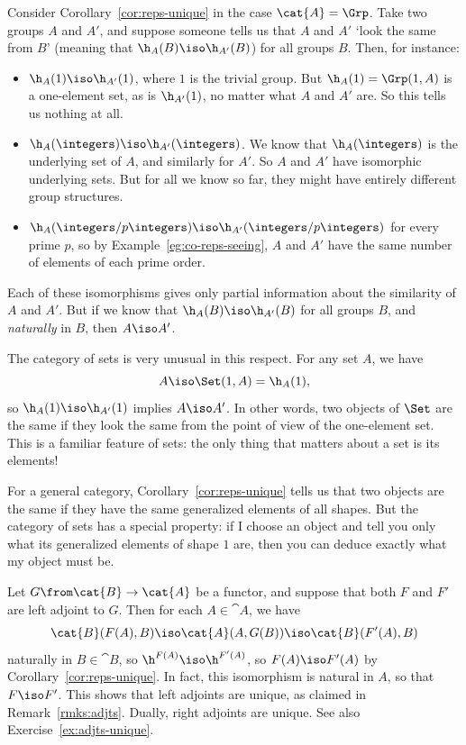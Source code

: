 \begin{example} 
Consider Corollary~\ref{cor:reps-unique} in the case $\cat{A} = \Grp$.
Take two groups $A$ and $A'$, and suppose someone tells us that $A$ and
$A'$ `look the same from $B$' (meaning that $\h_A(B) \iso \h_{A'}(B)$) for
all groups $B$.  Then, for instance:
% 
\begin{itemize}
\item 
$\h_A(1) \iso \h_{A'}(1)$, where $1$ is the trivial group.  But $\h_A(1) =
\Grp(1, A)$ is a one-element set, as is $\h_{A'}(1)$, no matter what $A$
and $A'$ are.  So this tells us nothing at all.

\item 
$\h_A(\integers) \iso \h_{A'}(\integers)$.  We know that $\h_A(\integers)$
is the underlying set of $A$, and similarly for $A'$.  So $A$ and $A'$
have isomorphic underlying sets.  But for all we know so far, they might
have entirely different group structures.

\item 
$\h_A(\integers/p\integers) \iso \h_{A'}(\integers/p\integers)$ for every
prime $p$, so by Example~\ref{eg:co-reps-seeing}, $A$ and $A'$ have the
same number of elements of each prime order.%
%
%
\end{itemize}
% 
Each of these isomorphisms gives only partial information about the
similarity of $A$ and $A'$.  But if we know that $\h_A(B) \iso \h_{A'}(B)$
for all groups $B$, and \emph{naturally} in $B$, then $A \iso A'$.
\end{example}

\begin{example}
The category of sets is very unusual in this respect.  For any set $A$, we have
\[
A \iso \Set(1, A) = \h_A(1),
\]
so $\h_A(1) \iso \h_{A'}(1)$ implies $A \iso A'$.  In other words, two
objects of $\Set$ are the same if they look the same from the point of view
of the one-element set.  This is a familiar feature of sets: the only thing
that matters about a set is its elements!

For a general category, Corollary~\ref{cor:reps-unique} tells us that two
objects are the same if they have the same generalized%
%
%
elements of all shapes.  But the category of sets has a special property:
if I choose an object and tell you only what its generalized elements of
shape $1$ are, then you can deduce exactly what my object must be.
\end{example}

\begin{example} 
\label{eg:yon-adjts-unique}
Let $G\from \cat{B} \to \cat{A}$ be a functor, and suppose that both $F$
and $F'$ are left adjoint to $G$.  Then for each $A \in \cat{A}$, we have
\[
\cat{B}(F(A), B)
\iso
\cat{A}(A, G(B))
\iso 
\cat{B}(F'(A), B)
\]
naturally in $B \in \cat{B}$, so $\h^{F(A)} \iso \h^{F'(A)}$, so $F(A) \iso
F'(A)$ by Corollary~\ref{cor:reps-unique}.  In fact, this isomorphism is
natural in $A$, so that $F \iso F'$.  This shows that left adjoints are
unique, as claimed in Remark~\ref{rmks:adjts}.
Dually, right adjoints are unique.  See also Exercise~\ref{ex:adjts-unique}.
\end{example}

